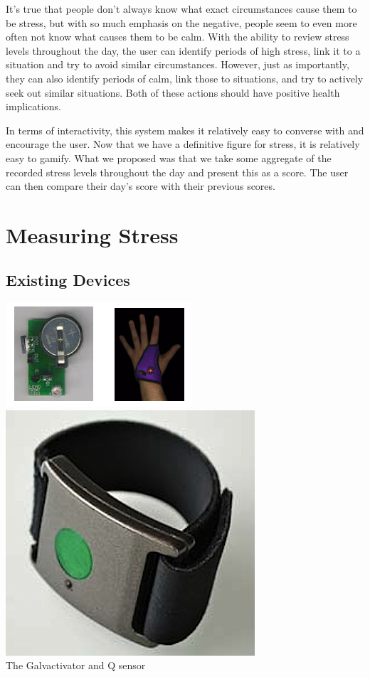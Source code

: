\documentclass{scrartcl}
\begin{document}
It's true that people don't always know what exact circumstances cause them to be stress, but with so much emphasis on the
negative, people seem to even more often not know what causes them to be calm. With the ability to review stress levels throughout
the day, the user can identify periods of high stress, link it to a situation and try to avoid similar circumstances. However,
just as importantly, they can also identify periods of calm, link those to situations, and try to actively seek out
similar situations. Both of these actions should have positive health implications.

In terms of interactivity, this system makes it relatively easy to converse with and encourage the user. Now that we have
a definitive figure for stress, it is relatively easy to gamify. What we proposed was that we take some aggregate of the
recorded stress levels throughout the day and present this as a score. The user can then compare their day's score with their
previous scores.


\section{Measuring Stress}
\subsection{Existing Devices}
\begin{center}
    \includegraphics[scale=0.8]{img/existingdevices.png} \hspace{10mm} 
    \includegraphics[scale=0.3]{img/q-sensor.jpg}\\
    The Galvactivator and Q sensor
\end{center}
\end{document}

